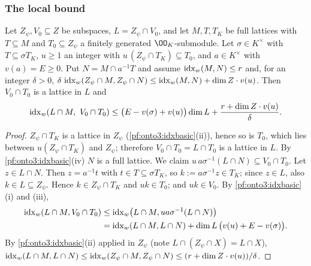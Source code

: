 \subsubsection{The local bound}

\begin{lemma}\label{pf:onto3:psigood}
Let $Z_\psi,V_0\subseteq Z$ be subspaces, $L=Z_\psi\cap V_0$, and let $M,T,T_K$ be full lattices with $T\subseteq
M$ and $T_0\subseteq Z_\psi$ a finitely generated $\OO_K$-submodule. Let $\sigma\in K^\times$ with $T\subseteq\sigma
T_K$, $u\ge1$ an integer with $u\,(Z_\psi\cap T_K)\subseteq T_0$, and $a\in K^\times$ with $v(a)=E\ge0$. Put
$N=M\cap a^{-1}T$ and assume $\operatorname{idx}_w(M,N)\le r$ and, for an integer $\delta>0$,
$\delta\,\operatorname{idx}_w(Z_\psi\cap M,Z_\psi\cap N)\le\operatorname{idx}_w(M,N)+\dim Z\cdot v(u)$. Then $V_0\cap T_0$ is
a lattice in $L$ and
\[
\operatorname{idx}_w(L\cap M,\ V_0\cap T_0)\le\bigl(E-v(\sigma)+v(u)\bigr)\dim L+\frac{r+\dim Z\cdot v(u)}{\delta}.
\]
\end{lemma}

\begin{proof}
$Z_\psi\cap T_K$ is a lattice in $Z_\psi$ (\cref{pf:onto3:idxbasic}(ii)), hence so is $T_0$, which lies between
$u(Z_\psi\cap T_K)$ and $Z_\psi$; therefore $V_0\cap T_0=L\cap T_0$ is a lattice in $L$. By
\cref{pf:onto3:idxbasic}(iv) $N$ is a full lattice. We claim
$u\,a\sigma^{-1}(L\cap N)\subseteq V_0\cap T_0$. Let $z\in L\cap N$. Then $z=a^{-1}t$ with $t\in T\subseteq\sigma
T_K$, so $k:=a\sigma^{-1}z\in T_K$; since $z\in L$, also $k\in L\subseteq Z_\psi$. Hence $k\in Z_\psi\cap T_K$ and
$uk\in T_0$; and $uk\in V_0$. By \cref{pf:onto3:idxbasic}(i) and (iii),
\begin{align*}
\operatorname{idx}_w(L\cap M,V_0\cap T_0)&\le\operatorname{idx}_w\bigl(L\cap M,ua\sigma^{-1}(L\cap N)\bigr)\\
&=\operatorname{idx}_w(L\cap M,L\cap N)+\dim L\,\bigl(v(u)+E-v(\sigma)\bigr).
\end{align*}
By \cref{pf:onto3:idxbasic}(ii) applied in $Z_\psi$ (note $L\cap(Z_\psi\cap X)=L\cap X$),
$\operatorname{idx}_w(L\cap M,L\cap N)\le\operatorname{idx}_w(Z_\psi\cap M,Z_\psi\cap N)\le(r+\dim Z\cdot v(u))/\delta$.
\end{proof}

